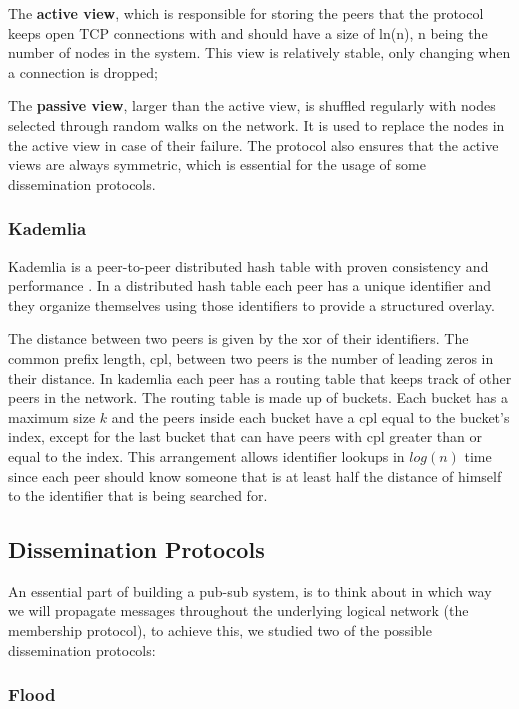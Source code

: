 \documentclass[sigconf]{acmart}
\begin{document}
The \textbf{active view}, which is responsible for storing the peers that the protocol keeps open TCP connections with and should have a size of ln(n), n being the number of nodes in the system. This view is relatively stable, only changing when a connection is dropped; 

The \textbf{passive view}, larger than the active view, is shuffled regularly with nodes selected through random walks on the network. It is used to replace the nodes in the active view in case of their failure. 
The protocol also ensures that the active views are always symmetric, which is essential for the usage of some dissemination protocols. 

\subsubsection{Kademlia}
Kademlia is a peer-to-peer distributed hash table with proven consistency and performance \cite{maymounkov2002kademlia}.
In a distributed hash table each peer has a unique identifier and they organize themselves using those identifiers to provide a structured overlay.

The distance between two peers is given by the xor of their identifiers.
The common prefix length, cpl, between two peers is the number of leading zeros in their distance.
In kademlia each peer has a routing table that keeps track of other peers in the network. The routing table is made up of buckets.
Each bucket has a maximum size $k$ and the peers inside each bucket have a cpl equal to the bucket's index, except for the last bucket that can have peers with cpl greater than or equal to the index.
This arrangement allows identifier lookups in $log(n)$ time since each peer should know someone that is at least half the distance of himself to the identifier that is being searched for.

\subsection{Dissemination Protocols}

An essential part of building a pub-sub system, is to think about in which way we will propagate messages throughout the underlying logical network (the membership protocol), to achieve this, we studied two of the possible dissemination protocols: 
\subsubsection{Flood} 
\end{document}
